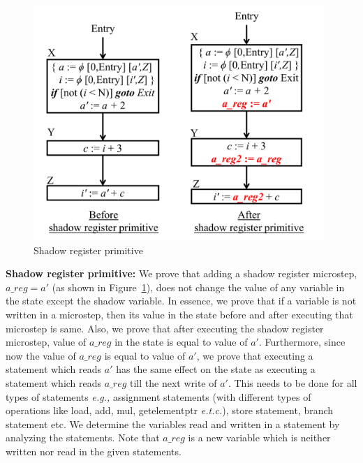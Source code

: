   
   
\begin{figure}[H]
\begin{center}
\includegraphics[height=3.5in]{fig-proposal/shadow-reg-primitive}
\end{center}
\caption{Shadow register primitive}
\label{fig:primitives2}
\end{figure}
 
{\bf Shadow register primitive:} We prove that adding
  a shadow register microstep, $a\_reg = a'$ (as shown in Figure~\ref{fig:primitives2}),
  does not change the value of any variable in the state except the shadow variable. 
  In essence, we prove
  that if a variable is not written in a microstep, then its value in the state before and after executing
  that microstep is same. Also, we prove that after executing the shadow register microstep,
  value of $a\_reg$ in the state is equal to value of $a'$. Furthermore, since now
  the value of $a\_reg$ is equal to value
  of $a'$, we prove that executing a statement which reads $a'$ has the same
  effect on the state as executing a statement which reads
  $a\_reg$ till the next write of $a'$. This needs to be done for all types of
  statements {\em e.g.,} assignment statements (with different types of 
  operations like load, add, mul, getelementptr {\em e.t.c.}), 
  store statement, branch statement etc. We determine the variables read and 
  written in a statement by analyzing the statements. 
  Note that $a\_reg$ is a new variable which
  is neither written nor read in the given statements.

